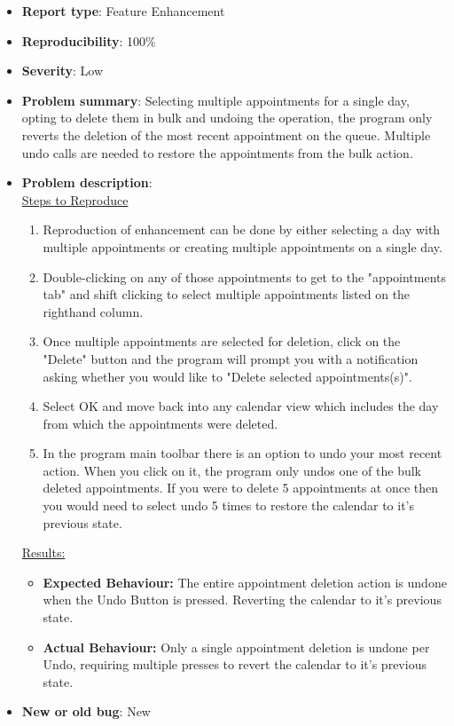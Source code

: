 \documentclass[fontsize=12pt,paper=letter,twoside]{scrartcl}
\begin{document}
\begin{itemize}
\item \textbf{Report type}: Feature Enhancement
\item \textbf{Reproducibility}: 100\%
\item \textbf{Severity}: Low
\item \textbf{Problem summary}: Selecting multiple appointments for a single day, opting to delete them in bulk and undoing the operation, the program only reverts the deletion of the most recent appointment on the queue. Multiple undo calls are needed to restore the appointments from the bulk action.
\item \textbf{Problem description}: \\
\underline{Steps to Reproduce}
\begin{enumerate}
\item Reproduction of enhancement can be done by either selecting a day with multiple appointments or creating multiple appointments on a single day. 
\item Double-clicking on any of those appointments to get to the "appointments tab" and shift clicking to select multiple appointments listed on the righthand column. 
\item Once multiple appointments are selected for deletion, click on the "Delete" button and the program will prompt you with a notification asking whether you would like to "Delete selected appointments(s)". 
\item Select OK and move back into any calendar view which includes the day from which the appointments were deleted. 
\item In the program main toolbar there is an option to undo your most recent action. When you click on it, the program only undos one of the bulk deleted appointments. If you were to delete 5 appointments at once then you would need to select undo 5 times to restore the calendar to it's previous state.
\end{enumerate}
\underline{Results:}
\begin{itemize}
\item \textbf{Expected Behaviour:} The entire appointment deletion action is undone when the Undo Button is pressed. Reverting the calendar to it's previous state.
\item \textbf{Actual Behaviour:} Only a single appointment deletion is undone per Undo, requiring multiple presses to revert the calendar to it's previous state.
\end{itemize}
\item \textbf{New or old bug}: New
\end{itemize}
\end{document}
